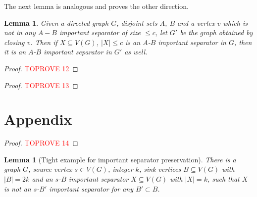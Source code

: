 \documentclass[11pt]{article}
\newtheorem{lemma}[theorem]{Lemma}
\begin{document}
{The next lemma is analogous and proves the other direction.

\begin{lemma}\label{lemma:mimicking2}
Given a directed graph $G$, disjoint sets $A$, $B$ and a vertex $v$ which is not in any $A-B$ important separator of size $\leq c$, let $G'$ be the graph obtained by closing $v$. Then if $X \subseteq V(G)$, $|X| \leq c$ is an $A$-$B$ important separator in $G$, then it is an $A$-$B$ important separator in $G'$ as well.
\end{lemma}

\begin{proof}\textcolor{red}{TOPROVE 12}\end{proof}






\begin{proof}\textcolor{red}{TOPROVE 13}\end{proof}
}
 



\appendix

\section{Appendix}

\lowerbound*
\begin{proof}\textcolor{red}{TOPROVE 14}\end{proof}

\begin{lemma}[Tight example for important separator preservation]\label{lemma:impseppreserve}
There is a graph $G$, source vertex $s \in V(G)$, integer $k$, sink vertices $B \subseteq V(G)$ with $|B| = 2k$ and an $s$-$B$ important separator $X \subseteq V(G)$ with $|X| = k$, such that $X$ is not an $s$-$B'$ important separator for any $B' \subset B$.
\end{lemma}
\end{document}
